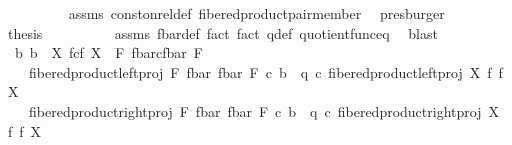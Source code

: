 \begin{isabellebody}
\ \ \ \ \ \ \ \ \isamarkupfalse%
\ assms{\isacharparenleft}{\kern0pt}{}{\isacharparenright}{\kern0pt}\ const{\isacharunderscore}{\kern0pt}on{\isacharunderscore}{\kern0pt}rel{\isacharunderscore}{\kern0pt}def\ fibered{\isacharunderscore}{\kern0pt}product{\isacharunderscore}{\kern0pt}pair{\isacharunderscore}{\kern0pt}member\ \isamarkupfalse%
\ presburger\isanewline
\ \ \ \ \ \ \isamarkupfalse%
\ {\isacharquery}{\kern0pt}thesis\isanewline
\ \ \ \ \ \ \ \ \isamarkupfalse%
\ assms{\isacharparenleft}{\kern0pt}{}{\isacharparenright}{\kern0pt}\ f{\isacharunderscore}{\kern0pt}bar{\isacharunderscore}{\kern0pt}def\ fact{}\ fact{}\ q{\isacharunderscore}{\kern0pt}def\ quotient{\isacharunderscore}{\kern0pt}func{\isacharunderscore}{\kern0pt}eq\ \isamarkupfalse%
\ blast\isanewline
\ \ \isamarkupfalse%
\isanewline
\isanewline
\ \ \isamarkupfalse%
\ {\isachardoublequoteopen}{\isasymexists}{\isacharbang}{\kern0pt}\ b{\isachardot}{\kern0pt}\ b\ {\isacharcolon}{\kern0pt}\ X\ \isactrlbsub f\isactrlesub {\isasymtimes}\isactrlsub c\isactrlbsub f\isactrlesub \ X\ {\isasymrightarrow}\ F\ \isactrlbsub {\isacharparenleft}{\kern0pt}f{\isacharunderscore}{\kern0pt}bar{\isacharparenright}{\kern0pt}\isactrlesub {\isasymtimes}\isactrlsub c\isactrlbsub {\isacharparenleft}{\kern0pt}f{\isacharunderscore}{\kern0pt}bar{\isacharparenright}{\kern0pt}\isactrlesub \ F\ {\isasymand}\isanewline
\ \ \ \ fibered{\isacharunderscore}{\kern0pt}product{\isacharunderscore}{\kern0pt}left{\isacharunderscore}{\kern0pt}proj\ F\ {\isacharparenleft}{\kern0pt}f{\isacharunderscore}{\kern0pt}bar{\isacharparenright}{\kern0pt}\ {\isacharparenleft}{\kern0pt}f{\isacharunderscore}{\kern0pt}bar{\isacharparenright}{\kern0pt}\ F\ {\isasymcirc}\isactrlsub c\ b\ {\isacharequal}{\kern0pt}\ q\ {\isasymcirc}\isactrlsub c\ fibered{\isacharunderscore}{\kern0pt}product{\isacharunderscore}{\kern0pt}left{\isacharunderscore}{\kern0pt}proj\ X\ f\ f\ X\ {\isasymand}\isanewline
\ \ \ \ fibered{\isacharunderscore}{\kern0pt}product{\isacharunderscore}{\kern0pt}right{\isacharunderscore}{\kern0pt}proj\ F\ {\isacharparenleft}{\kern0pt}f{\isacharunderscore}{\kern0pt}bar{\isacharparenright}{\kern0pt}\ {\isacharparenleft}{\kern0pt}f{\isacharunderscore}{\kern0pt}bar{\isacharparenright}{\kern0pt}\ F\ {\isasymcirc}\isactrlsub c\ b\ {\isacharequal}{\kern0pt}\ q\ {\isasymcirc}\isactrlsub c\ fibered{\isacharunderscore}{\kern0pt}product{\isacharunderscore}{\kern0pt}right{\isacharunderscore}{\kern0pt}proj\ X\ f\ f\ X\ {\isasymand}\isanewline

\end{isabellebody}
